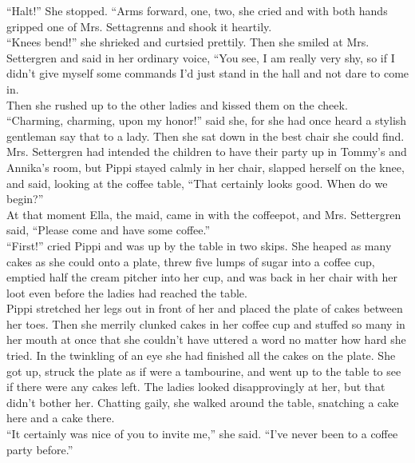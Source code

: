 \documentclass{standard}
\begin{document}
“Halt!” She stopped. “Arms forward, one, two, she cried and with both hands gripped one of Mrs. Settagrenns and shook it heartily.\\

“Knees bend!” she shrieked and curtsied prettily. Then she smiled at Mrs. Settergren and said in her ordinary voice, “You see, I am really very shy, so if I didn’t give myself some commands I’d just stand in the hall and not dare to come in.\\

Then she rushed up to the other ladies and kissed them on the cheek.\\

“Charming, charming, upon my honor!” said she, for she had once heard a stylish gentleman say that to a lady. Then she sat down in the best chair she could find. Mrs. Settergren had intended the children to have their party up in Tommy’s and Annika’s room, but Pippi stayed calmly in her chair, slapped herself on the knee, and said, looking at the coffee table, “That certainly looks good. When do we begin?”\\

At that moment Ella, the maid, came in with the coffeepot, and Mrs. Settergren said, “Please come and have some coffee.”\\

“First!” cried Pippi and was up by the table in two skips. She heaped as many cakes as she could onto a plate, threw five lumps of sugar into a coffee cup, emptied half the cream pitcher into her cup, and was back in her chair with her loot even before the ladies had reached the table.\\

Pippi stretched her legs out in front of her and placed the plate of cakes between her toes. Then she merrily clunked cakes in her coffee cup and stuffed so many in her mouth at once that she couldn’t have uttered a word no matter how hard she tried. In the twinkling of an eye she had finished all the cakes on the plate. She got up, struck the plate as if were a tambourine, and went up to the table to see if there were any cakes left. The ladies looked disapprovingly at her, but that didn’t bother her. Chatting gaily, she walked around the table, snatching a cake here and a cake there.\\

“It certainly was nice of you to invite me,” she said. “I’ve never been to a coffee party before.”\\
\end{document}
